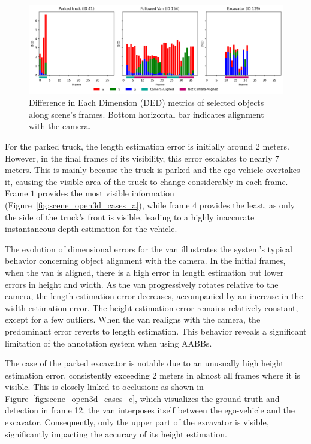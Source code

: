 \begin{figure}[!ht]
    \centering
    \includegraphics[width=\linewidth]{./images/experiments/ded_selected_objects.png}
    \caption{Difference in Each Dimension (DED) metrics of selected objects along scene's frames. Bottom horizontal bar indicates alignment with the camera.}
    \label{fig:scene_ded_cases}
\end{figure}

For the parked truck, the length estimation error is initially around $2$ meters. However, in the final frames of its visibility, this error escalates to nearly $7$ meters. This is mainly because the truck is parked and the ego-vehicle overtakes it, causing the visible area of the truck to change considerably in each frame. Frame $1$ provides the most visible information (Figure~\ref{fig:scene_open3d_cases_a}), while frame $4$ provides the least, as only the side of the truck's front is visible, leading to a highly inaccurate instantaneous depth estimation for the vehicle.

The evolution of dimensional errors for the van illustrates the system's typical behavior concerning object alignment with the camera. In the initial frames, when the van is aligned, there is a high error in length estimation but lower errors in height and width. As the van progressively rotates relative to the camera, the length estimation error decreases, accompanied by an increase in the width estimation error. The height estimation error remains relatively constant, except for a few outliers. When the van realigns with the camera, the predominant error reverts to length estimation. This behavior reveals a significant limitation of the annotation system when using \acp{AABB}.

The case of the parked excavator is notable due to an unusually high height estimation error, consistently exceeding 2 meters in almost all frames where it is visible. This is closely linked to occlusion: as shown in Figure~\ref{fig:scene_open3d_cases_c}, which visualizes the ground truth and detection in frame 12, the van interposes itself between the ego-vehicle and the excavator. Consequently, only the upper part of the excavator is visible, significantly impacting the accuracy of its height estimation.

